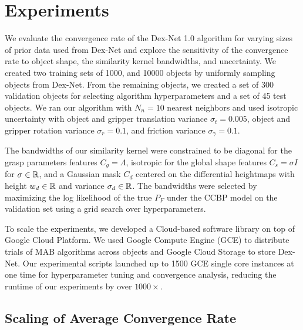 \section{Experiments}


We evaluate the convergence rate of the Dex-Net 1.0 algorithm for varying sizes of prior data used from Dex-Net and explore the sensitivity of the convergence rate to object shape, the similarity kernel bandwidths, and uncertainty.
We created two training sets of 1000, and 10000 objects by uniformly sampling objects from Dex-Net.
From the remaining objects, we created a set of 300 validation objects for selecting algorithm hyperparameters and a set of 45 test objects.
We ran our algorithm with $N_n = 10$ nearest neighbors and used isotropic uncertainty with object and gripper translation variance $\sigma_{t} = 0.005$, object and gripper rotation variance $\sigma_{r} = 0.1$, and friction variance $\sigma_{\gamma} = 0.1$.

The bandwidths of our similarity kernel were constrained to be diagonal for the grasp parameters features $C_g = \Lambda$, isotropic for the global shape features $C_s = \sigma I$ for $\sigma \in \mathbb{R}$, and a Gaussian mask $C_d$ centered on the differential heightmaps with height $w_d \in \mathbb{R}$ and variance $\sigma_d \in \mathbb{R}$.
The bandwidths were selected by maximizing the log likelihood of the true $P_F$ under the CCBP model on the validation set using a grid search over hyperparameters.

To scale the experiments, we developed a Cloud-based software library on top of Google Cloud Platform.
We used Google Compute Engine (GCE) to distribute trials of MAB algorithms across objects and Google Cloud Storage to store Dex-Net.
Our experimental scripts launched up to 1500 GCE single core instances at one time for hyperparameter tuning and convergence analysis, reducing the runtime of our experiments by over $1000\times$.

\subsection{Scaling of Average Convergence Rate}

